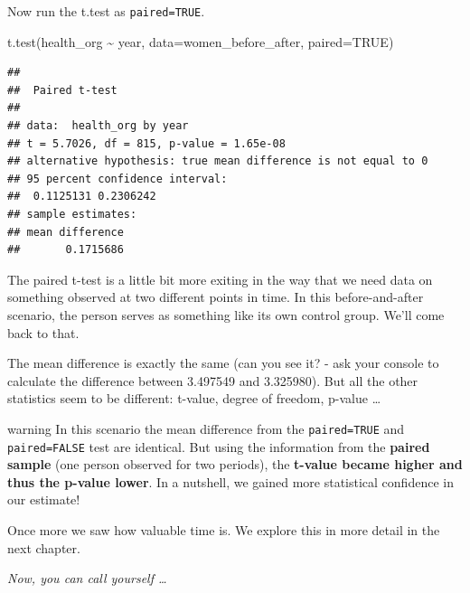 \documentclass[
]{book}
\newenvironment{Shaded}{\begin{snugshade}}{\end{snugshade}}
\newcommand{\AttributeTok}[1]{\textcolor[rgb]{0.77,0.63,0.00}{#1}}
\newcommand{\ConstantTok}[1]{\textcolor[rgb]{0.00,0.00,0.00}{#1}}
\newcommand{\FunctionTok}[1]{\textcolor[rgb]{0.00,0.00,0.00}{#1}}
\newcommand{\NormalTok}[1]{#1}
\newcommand{\SpecialCharTok}[1]{\textcolor[rgb]{0.00,0.00,0.00}{#1}}
\begin{document}
Now run the t.test as \texttt{paired=TRUE}.

\begin{Shaded}
\begin{Highlighting}[]
\FunctionTok{t.test}\NormalTok{(health\_org }\SpecialCharTok{\textasciitilde{}}\NormalTok{ year, }\AttributeTok{data=}\NormalTok{women\_before\_after, }\AttributeTok{paired=}\ConstantTok{TRUE}\NormalTok{)}
\end{Highlighting}
\end{Shaded}

\begin{verbatim}
## 
##  Paired t-test
## 
## data:  health_org by year
## t = 5.7026, df = 815, p-value = 1.65e-08
## alternative hypothesis: true mean difference is not equal to 0
## 95 percent confidence interval:
##  0.1125131 0.2306242
## sample estimates:
## mean difference 
##       0.1715686
\end{verbatim}

The paired t-test is a little bit more exiting in the way that we need data on something observed at two different points in time. In this before-and-after scenario, the person serves as something like its own control group. We'll come back to that.

The mean difference is exactly the same (can you see it? - ask your console to calculate the difference between 3.497549 and 3.325980). But all the other statistics seem to be different: t-value, degree of freedom, p-value \ldots{}

\begin{infobox2}warning
In this scenario the mean difference from the \texttt{paired=TRUE} and \texttt{paired=FALSE} test are identical. But using the information from the \textbf{paired sample} (one person observed for two periods), the \textbf{t-value became higher and thus the p-value lower}. In a nutshell, we gained more statistical confidence in our estimate!

\end{infobox2}

Once more we saw how valuable time is. We explore this in more detail in the next chapter.

\emph{Now, you can call yourself \ldots{}}
\end{document}
